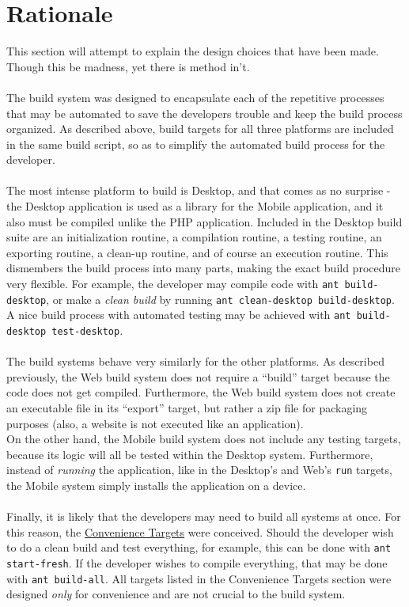 \documentclass[12pt]{report}
\begin{document}
\section{Rationale}
This section will attempt to explain the design choices that have been made. Though this be madness,
yet there is method in't.\\\\
The build system was designed to encapsulate each of the repetitive processes that may be automated
to save the developers trouble and keep the build process organized. As described above, build
targets for all three platforms are included in the same build script, so as to simplify the
automated build process for the developer.\\\\
The most intense platform to build is Desktop, and that comes as no surprise - the Desktop
application is used as a library for the Mobile application, and it also must be compiled unlike the
PHP application. Included in the Desktop build suite are an initialization routine, a compilation
routine, a testing routine, an exporting routine, a clean-up routine, and of course an execution
routine. This dismembers the build process into many parts, making the exact build procedure very
flexible. For example, the developer may compile code with \texttt{ant build-desktop}, or make a
\textit{clean build} by running \texttt{ant clean-desktop build-desktop}. A nice build process with
automated testing may be achieved with \texttt{ant build-desktop test-desktop}.\\\\
The build systems behave very similarly for the other platforms. As described previously, the Web
build system does not require a ``build'' target because the code does not get compiled.
Furthermore, the Web build system does not create an executable file in its ``export'' target, but
rather a zip file for packaging purposes (also, a website is not executed like an application).\\
On the other hand, the Mobile build system does not include any testing targets, because its logic
will all be tested within the Desktop system. Furthermore, instead of \textit{running} the
application, like in the Desktop's and Web's \texttt{run} targets, the Mobile system simply installs
the application on a device.\\\\
Finally, it is likely that the developers may need to build all systems at once. For this reason,
the \hyperref[s:build-convenience]{Convenience Targets} were conceived. Should the developer wish to
do a clean build and test everything, for example, this can be done with \texttt{ant start-fresh}.
If the developer wishes to compile everything, that may be done with \texttt{ant build-all}. All
targets listed in the Convenience Targets section were designed \textit{only} for convenience and
are not crucial to the build system.
\end{document}
